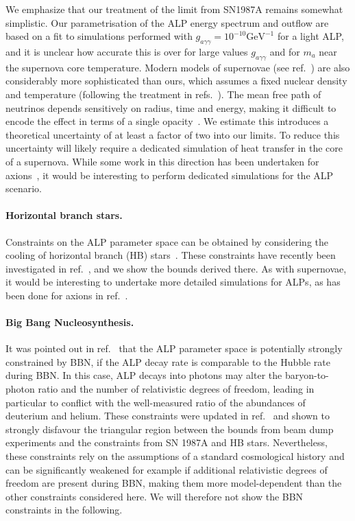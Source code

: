 \documentclass[11pt,a4paper]{article}
\newcommand{\ga}{g_{a\gamma\gamma}}
\begin{document}
We emphasize that our treatment of the limit from SN1987A remains somewhat simplistic. Our parametrisation of the ALP energy spectrum and outflow are based on a fit to simulations performed with $\ga=10^{-10}\mathrm{GeV^{-1}}$ for a light ALP, and it is unclear how accurate this is over for large values $\ga$ and for $m_a$ near the supernova core temperature. Modern models of supernovae (see ref.~\cite{Janka:2012wk}) are also considerably more sophisticated than ours, which assumes a fixed nuclear density and temperature (following the treatment in refs.~\cite{Raffelt:1987yb,Masso:1995tw}). The mean free path of neutrinos depends sensitively on radius, time and energy, making it difficult to encode the effect in terms of a single opacity~\cite{Buras:2005rp}. We estimate this introduces a theoretical uncertainty of at least a factor of two into our limits. To reduce this uncertainty will likely require a dedicated simulation of heat transfer in the core of a supernova. While some work in this direction has been undertaken for axions~\cite{Payez:2014xsa,Fischer:2016cyd}, it would be interesting to perform dedicated simulations for the ALP scenario.

\paragraph{Horizontal branch stars.}
Constraints on the ALP parameter space can be obtained by considering the cooling of horizontal branch (HB) stars~\cite{Raffelt:1987yb,Raffelt:1996wa}. These constraints have recently been investigated in ref.~\cite{Cadamuro:2011fd}, and we show the bounds derived there. As with supernovae, it would be interesting to undertake more detailed simulations for ALPs, as has been done for axions in ref.~\cite{Friedland:2012hj}.

\paragraph{Big Bang Nucleosynthesis.}
It was pointed out in ref.~\cite{Cadamuro:2011fd} that the ALP parameter space is potentially strongly constrained by BBN, if the ALP decay rate is comparable to the Hubble rate during BBN. In this case, ALP decays into photons may alter the baryon-to-photon ratio and the number of relativistic degrees of freedom, leading in particular to conflict with the well-measured ratio of the abundances of deuterium and helium. These constraints were updated in ref.~\cite{Millea:2015qra} and shown to strongly disfavour the triangular region between the bounds from beam dump experiments and the constraints from SN 1987A and HB stars. Nevertheless, these constraints rely on the assumptions of a standard cosmological history and can be significantly weakened for example if additional relativistic degrees of freedom are present during BBN, making them more model-dependent than the other constraints considered here. We will therefore not show the BBN constraints in the following.
\end{document}
